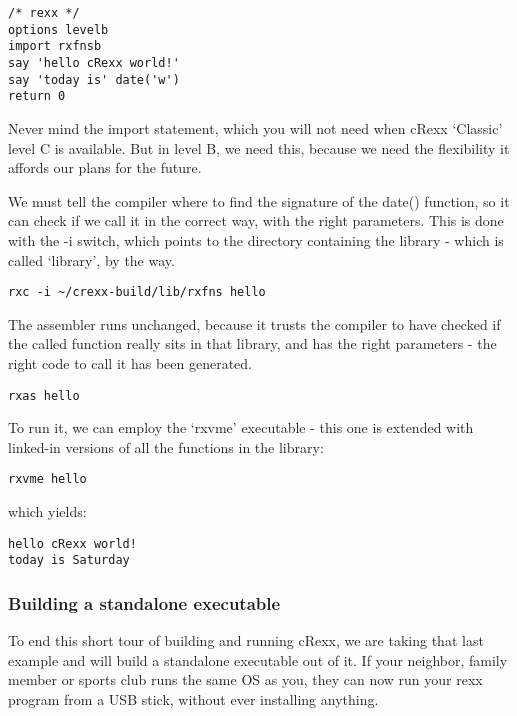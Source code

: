 \begin{verbatim}
/* rexx */
options levelb
import rxfnsb
say 'hello cRexx world!'
say 'today is' date('w')
return 0
\end{verbatim}

Never mind the import statement, which you will not need when cRexx
`Classic' level C is available. But in level B, we need this, because we
need the flexibility it affords our plans for the future.

We must tell the compiler where to find the signature of the date()
function, so it can check if we call it in the correct way, with the
right parameters. This is done with the -i switch, which points to the
directory containing the library - which is called `library', by the
way.

\begin{verbatim}
rxc -i ~/crexx-build/lib/rxfns hello
\end{verbatim}

The assembler runs unchanged, because it trusts the compiler to have
checked if the called function really sits in that library, and has the
right parameters - the right code to call it has been generated.

\begin{verbatim}
rxas hello
\end{verbatim}

To run it, we can employ the `rxvme' executable - this one is extended
with linked-in versions of all the functions in the library:

\begin{verbatim}
rxvme hello
\end{verbatim}

which yields:

\begin{verbatim}
hello cRexx world!
today is Saturday
\end{verbatim}

\hypertarget{building-a-standalone-executable}{%
\subsubsection{Building a standalone
executable}\label{building-a-standalone-executable}}

To end this short tour of building and running cRexx, we are taking that
last example and will build a standalone executable out of it. If your
neighbor, family member or sports club runs the same OS as you, they can
now run your rexx program from a USB stick, without ever installing
anything.

